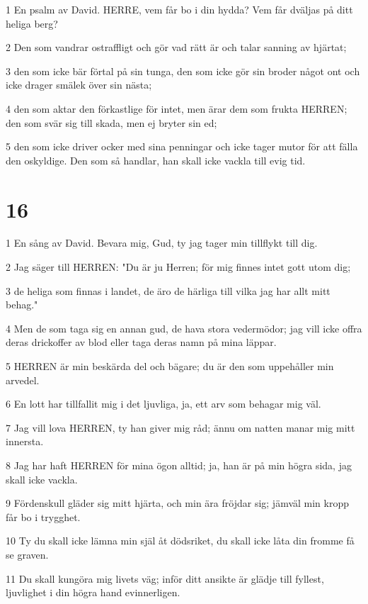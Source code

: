 \par 1 En psalm av David. HERRE, vem får bo i din hydda? Vem får dväljas på ditt heliga berg?
\par 2 Den som vandrar ostraffligt och gör vad rätt är och talar sanning av hjärtat;
\par 3 den som icke bär förtal på sin tunga, den som icke gör sin broder något ont och icke drager smälek över sin nästa;
\par 4 den som aktar den förkastlige för intet, men ärar dem som frukta HERREN; den som svär sig till skada, men ej bryter sin ed;
\par 5 den som icke driver ocker med sina penningar och icke tager mutor för att fälla den oskyldige. Den som så handlar, han skall icke vackla till evig tid.

\chapter{16}

\par 1 En sång av David. Bevara mig, Gud, ty jag tager min tillflykt till dig.
\par 2 Jag säger till HERREN: "Du är ju Herren; för mig finnes intet gott utom dig;
\par 3 de heliga som finnas i landet, de äro de härliga till vilka jag har allt mitt behag."
\par 4 Men de som taga sig en annan gud, de hava stora vedermödor; jag vill icke offra deras drickoffer av blod eller taga deras namn på mina läppar.
\par 5 HERREN är min beskärda del och bägare; du är den som uppehåller min arvedel.
\par 6 En lott har tillfallit mig i det ljuvliga, ja, ett arv som behagar mig väl.
\par 7 Jag vill lova HERREN, ty han giver mig råd; ännu om natten manar mig mitt innersta.
\par 8 Jag har haft HERREN för mina ögon alltid; ja, han är på min högra sida, jag skall icke vackla.
\par 9 Fördenskull gläder sig mitt hjärta, och min ära fröjdar sig; jämväl min kropp får bo i trygghet.
\par 10 Ty du skall icke lämna min själ åt dödsriket, du skall icke låta din fromme få se graven.
\par 11 Du skall kungöra mig livets väg; inför ditt ansikte är glädje till fyllest, ljuvlighet i din högra hand evinnerligen.

